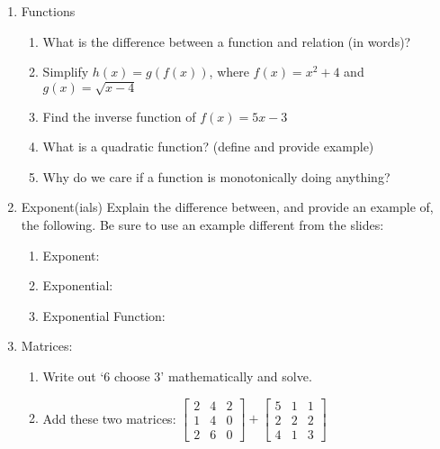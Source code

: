 \documentclass[12pt,thmsa]{article}
\begin{document}
\begin{enumerate}
    \item Functions
        \begin{enumerate}
            \item What is the difference between a function and relation (in words)?
            \item Simplify $h(x)=g(f(x))$, where $f(x)=x^2+4$ and $g(x)=\sqrt{x-4}$ 
            \item Find the inverse function of $f(x)=5x-3$ 
            \item What is a quadratic function? (define and provide example) 
            \item Why do we care if a function is monotonically doing anything?
        \end{enumerate}

    \item Exponent(ials)
        Explain the difference between, and provide an example of, the following. Be sure to use an example different from the slides: 
            \begin{enumerate}
                \item Exponent:
                \item Exponential:
                \item Exponential Function: 
            \end{enumerate}

    \item Matrices:
            \begin{enumerate}
                \item Write out `6 choose 3' mathematically and solve.
                \item Add these two matrices: $
                    \begin{bmatrix}
                        2 & 4 & 2 \\
                        1 & 4 & 0 \\
                        2 & 6 & 0
                    \end{bmatrix}
                        +
                     \begin{bmatrix}
                     5 & 1 & 1 \\
                     2 & 2 & 2\\
                     4 & 1 & 3
                     \end{bmatrix}$



\end{enumerate}
\end{enumerate}
\end{document}
